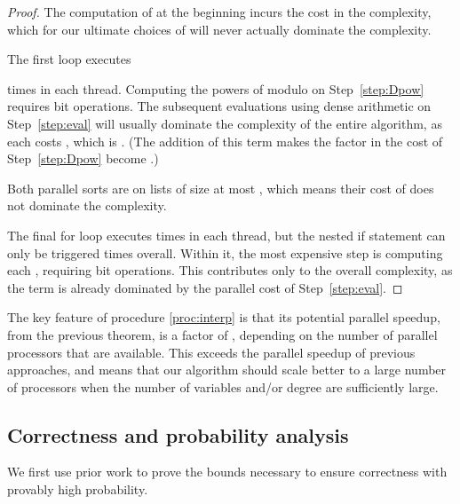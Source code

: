 \documentclass[letterpaper,10pt]{article}
\begin{document}
\begin{proof}
  The computation of  at the beginning incurs the 
  cost in the complexity, which for our ultimate choices of  will
  never actually dominate the complexity.

  The first loop executes 
  
  times in each thread.
  Computing the powers of  modulo  on Step~\ref{step:Dpow}
  requires  bit operations. The subsequent
  evaluations using dense arithmetic on Step~\ref{step:eval} will
  usually dominate the complexity of the entire algorithm, as each costs
  , which is .
  (The addition of this term makes the  factor in the cost of
  Step~\ref{step:Dpow} become .)

  Both parallel sorts are on lists of size at most , which means
  their cost of  does not
  dominate the complexity.

  The final for loop executes  times in each
  thread, but the nested if statement can only be triggered  times
  overall. Within it, the most expensive step is computing each
  , requiring 
  bit operations. This contributes only
   to the overall complexity, as
  the term  is already dominated by the
  parallel cost of Step~\ref{step:eval}.
\end{proof}

The key feature of procedure \ref{proc:interp} is that its potential
parallel speedup, from the previous theorem, is a factor of 
, depending on the number of parallel processors 
that are available. This exceeds the  parallel speedup of previous
approaches, and means that our algorithm should scale better to a large
number of processors when the number of variables and/or degree are
sufficiently large.

\subsection{Correctness and probability analysis}

We first use prior work to prove the bounds necessary to ensure
correctness with provably high probability. 
\end{document}
